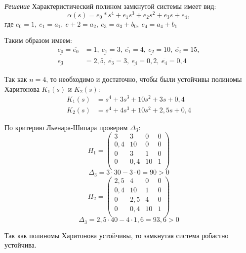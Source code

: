 \documentclass[../../TAU.tex]{subfiles}
\begin{document}
    {\it Решение}
    Характеристический полином замкнутой системы имеет вид:
    $$
        \alpha(s)=e_0*s^4+e_1s^3+e_2s^2+e_3s+e_4,
    $$    
    где 
    $e_0=1,\ e_1=a_1,\ e+2 =a_2,\ e_3=a_3+b_0,\ e_4=a_4+b_1$

    Таким образом имеем:
    \begin{align*}
        \underline{e_0}=\overline{e_0}&=1,\ 
        \underline{e_1}=3,\ \overline{e_1}=4,\
        \underline{e_2}=10,\ \overline{e_2}=15,\\
        \underline{e_3}&=2{,}5,\ \overline{e_3}=3,\ 
        \underline{e_4}=0{,}2,\ \overline{e_4}=0{,}4
    \end{align*}

    Так как $n=4$, то необходимо и достаточно, чтобы были устойчивы полиномы  Харитонова 
    ${K}_1(s)$ и ${K}_2(s)$:
    \begin{align*}
        K_1(s)&=s^4+3s^3+10s^2+3s+0{,}4\\
        K_2(s)&=s^4+4s^3+10s^2+2{,}5s+0{,}4
    \end{align*}

    По критерию Льенара-Шипара проверим $\Delta_3$:
    $$
        H_1=
        \begin{pmatrix}
            3 & 3 & 0 & 0 \\
            0{,}4 & 10 & 0 & 0 \\
            0 & 3 & 1 & 0 \\
            0 & 0{,}4 & 10 & 1 \\
        \end{pmatrix}
    $$
    $$
        \Delta_3=3\cdot30-3\cdot0=90>0
    $$
    $$
        H_2=
        \begin{pmatrix}
            2{,}5 & 4 & 0 & 0 \\
            0{,}4 & 10 & 1 & 0 \\
            0 & 2{,}5 & 4 & 0 \\
            0 & 0{,}4 & 10 & 1 \\
        \end{pmatrix}
    $$
    $$
        \Delta_3=2{,}5\cdot40-4\cdot1{,}6=93{,}6>0
    $$

    Так как полиномы Харитонова устойчивы, то замкнутая система робастно устойчива.
\end{document}
